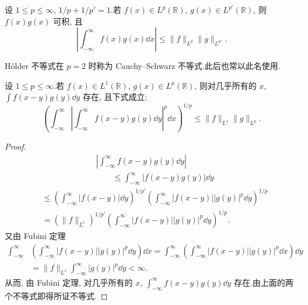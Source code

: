\begin{theorem}\label{thm:1.1.7}
设 $1 \leq p \leq \infty$, $1/p + 1/p' = 1$.若 $f(x) \in L^{p}(\mathbb{R})$, $g(x) \in L^{p'}(\mathbb{R})$, 则 $f(x)g(x)$ 可积, 且
\begin{equation*}
\left| \int_{-\infty}^{\infty} f(x)g(x)\dd x \right| \leq \| f \|_{L^{p}} \| g \|_{L^{p'}}.
\end{equation*}
\end{theorem}

Hölder 不等式在 $p = 2$ 时称为 Cauchy--Schwarz 不等式.此后也常以此名使用.

\begin{theorem}\label{thm:1.1.8}
设 $1 \leq p \leq \infty$.若 $f(x) \in L^{1}(\mathbb{R})$, $g(x) \in L^{p}(\mathbb{R})$, 则对几乎所有的 $x$, $\int f(x-y)g(y)\dd y$ 存在, 且下式成立:
\begin{equation*}
\left(\int_{-\infty}^{\infty}\left| \int_{-\infty}^{\infty} f(x-y)g(y)\dd y \right|^{p}\dd x\right)^{1/p} \leq \| f \|_{L^{1}} \| g \|_{L^{p}}.
\end{equation*}
\end{theorem}

\begin{proof}
\begin{align*}
& \left| \int_{-\infty}^{\infty} f(x-y)g(y)\dd y \right| \\
& \qquad \leq \int_{-\infty}^{\infty} |f(x-y)g(y)|\dd y
\end{align*}
\begin{align*}
&\leq \left(\int_{-\infty}^{\infty} |f(x-y)|\dd y\right)^{1/p'}\left(\int_{-\infty}^{\infty} |f(x-y)||g(y)|^{p}\dd y\right)^{1/p} \\
&= (\| f \|_{L^{1}})^{1/p'}\left(\int_{-\infty}^{\infty} |f(x-y)||g(y)|^{p}\dd y\right)^{1/p}.
\end{align*}
又由 Fubini 定理
\begin{align*}
\int_{-\infty}^{\infty} & \left(\int_{-\infty}^{\infty} |f(x-y)||g(y)|^{p}\dd y\right)\dd x
= \int_{-\infty}^{\infty}\left(\int_{-\infty}^{\infty} |f(x-y)||g(y)|^{p}\dd x\right)\dd y \\
& = \| f \|_{L^{1}} \int_{-\infty}^{\infty} |g(y)|^{p}\dd y < \infty.
\end{align*}
从而, 由 Fubini 定理, 对几乎所有的 $x$, $\int_{-\infty}^{\infty} f(x-y)g(y)\dd y$ 存在.由上面的两个不等式即得所证不等式.
\end{proof}

